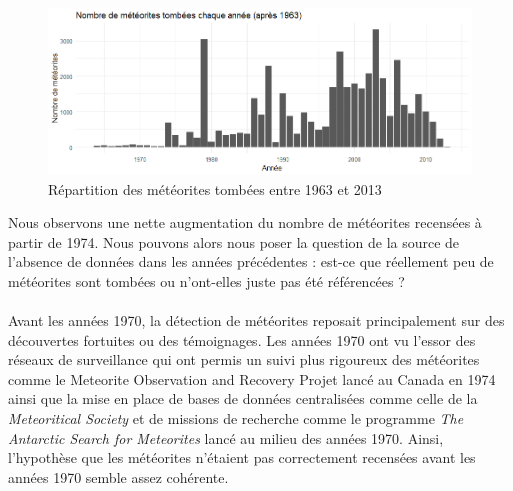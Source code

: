 \documentclass[12pt]{article}
\begin{document}
\begin{figure}[H]
\centering
\includegraphics[width=16cm]{Images/exploration/histogramme1963-2013.png}
\caption{Répartition des météorites tombées entre 1963 et 2013}
\end{figure}
Nous observons une nette augmentation du nombre de météorites recensées à partir de 1974. Nous pouvons alors nous poser la question de la source de l'absence de données dans les années précédentes : est-ce que réellement peu de météorites sont tombées ou n'ont-elles juste pas été référencées ?\\
\\
Avant les années 1970, la détection de météorites reposait principalement sur des découvertes fortuites ou des témoignages. Les années 1970 ont vu l'essor des réseaux de surveillance qui ont permis un suivi plus rigoureux des météorites comme le Meteorite Observation and Recovery Projet \cite{Article_Canada_1970} lancé au Canada en 1974 ainsi que la mise en place de bases de données centralisées comme celle de la \textit{Meteoritical Society} \cite{BDD_centralisees} et de missions de recherche comme le programme \textit{The Antarctic Search for Meteorites} \cite{Mission_recherche_antartictique} lancé au milieu des années 1970. Ainsi, l'hypothèse que les météorites n'étaient pas correctement recensées avant les années 1970 semble assez cohérente.
\end{document}
